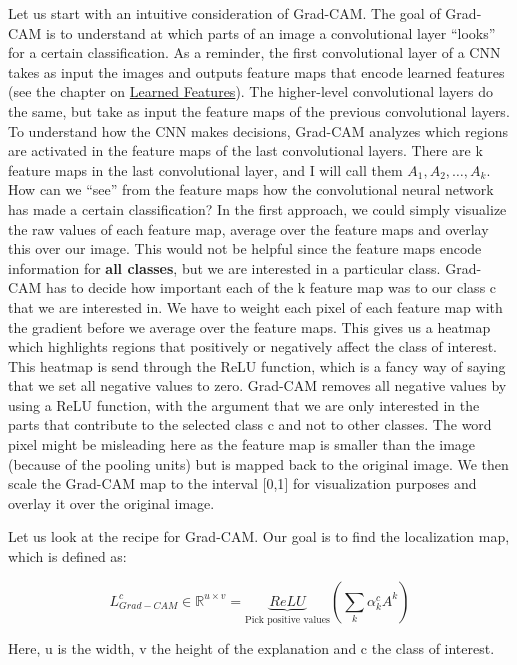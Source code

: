 \documentclass[
  10pt,
]{scrbook}
\begin{document}
Let us start with an intuitive consideration of Grad-CAM.
The goal of Grad-CAM is to understand at which parts of an image a convolutional layer ``looks'' for a certain classification.
As a reminder, the first convolutional layer of a CNN takes as input the images and outputs feature maps that encode learned features (see the chapter on \protect\hyperlink{cnn-features}{Learned Features}).
The higher-level convolutional layers do the same, but take as input the feature maps of the previous convolutional layers.
To understand how the CNN makes decisions, Grad-CAM analyzes which regions are activated in the feature maps of the last convolutional layers.
There are k feature maps in the last convolutional layer, and I will call them \(A_1, A_2, \ldots, A_k\).
How can we ``see'' from the feature maps how the convolutional neural network has made a certain classification?
In the first approach, we could simply visualize the raw values of each feature map, average over the feature maps and overlay this over our image.
This would not be helpful since the feature maps encode information for \textbf{all classes}, but we are interested in a particular class.
Grad-CAM has to decide how important each of the k feature map was to our class c that we are interested in.
We have to weight each pixel of each feature map with the gradient before we average over the feature maps.
This gives us a heatmap which highlights regions that positively or negatively affect the class of interest.
This heatmap is send through the ReLU function, which is a fancy way of saying that we set all negative values to zero.
Grad-CAM removes all negative values by using a ReLU function, with the argument that we are only interested in the parts that contribute to the selected class c and not to other classes.
The word pixel might be misleading here as the feature map is smaller than the image (because of the pooling units) but is mapped back to the original image.
We then scale the Grad-CAM map to the interval {[}0,1{]} for visualization purposes and overlay it over the original image.

Let us look at the recipe for Grad-CAM.
Our goal is to find the localization map, which is defined as:

\[L^c_{Grad-CAM} \in \mathbb{R}^{u\times v} = \underbrace{ReLU}_{\text{Pick positive values}}\left(\sum_{k} \alpha_k^c A^k\right)\]

Here, u is the width, v the height of the explanation and c the class of interest.
\end{document}
